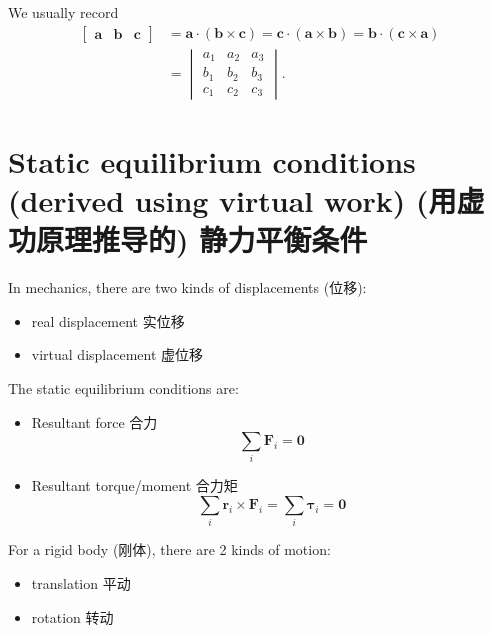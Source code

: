 We usually record \begin{align*}
    \begin{bmatrix} \boldsymbol a & \boldsymbol b & \boldsymbol c \end{bmatrix} & = \boldsymbol a \cdot (\boldsymbol b \times \boldsymbol c) = \boldsymbol c \cdot (\boldsymbol a \times \boldsymbol b) = \boldsymbol b \cdot (\boldsymbol c \times \boldsymbol a) \\
    & = \begin{vmatrix}
            a_1 & a_2 & a_3 \\
            b_1 & b_2 & b_3 \\
            c_1 & c_2 & c_3
    \end{vmatrix}.
\end{align*}

\section[Static equilibrium conditions 静力平衡条件]{Static equilibrium conditions (derived using virtual work)
(用虚功原理推导的)
静力平衡条件}\label{static-equilibrium-conditions-derived-using-virtual-work-ux7528ux865aux529fux539fux7406ux63a8ux5bfcux7684-ux9759ux529bux5e73ux8861ux6761ux4ef6}

In mechanics, there are two kinds of displacements (位移):

\begin{itemize}
\tightlist{}
\item real displacement 实位移
\item virtual displacement 虚位移
\end{itemize}

The static equilibrium conditions are:

\begin{itemize}
\tightlist{}
\item Resultant force 合力
    \[\sum_i \boldsymbol F_i = \boldsymbol 0\]
\item
    Resultant torque/moment 合力矩
    \[\sum_i \boldsymbol r_i \times \boldsymbol F_i = \sum_i \boldsymbol \tau_i = \boldsymbol 0\]
\end{itemize}

For a rigid body (刚体), there are 2 kinds of motion:

\begin{itemize}
\tightlist{}
\item translation 平动
\item rotation 转动
\end{itemize}

